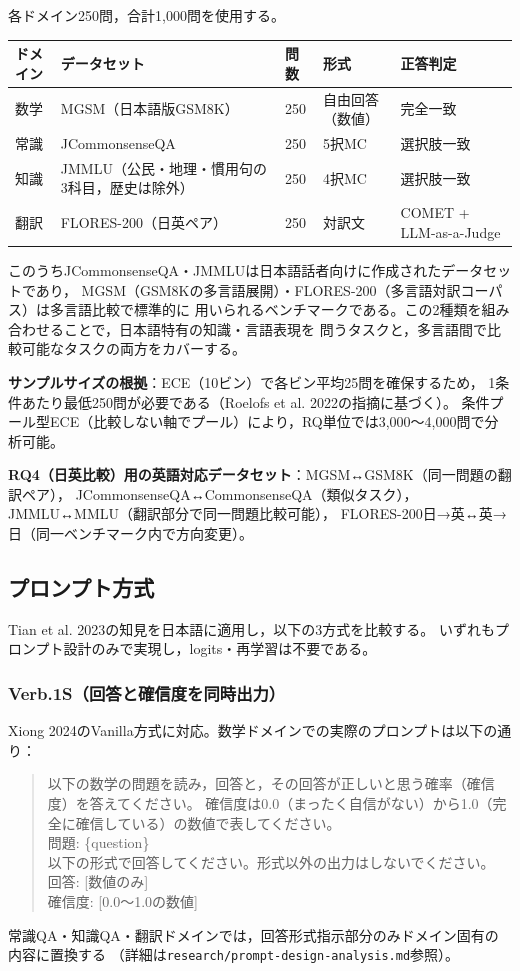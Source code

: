 \documentclass[11pt,a4paper,oneside]{article}
\begin{document}
各ドメイン250問，合計1,000問を使用する。

\begin{center}
\begin{tabular}{lllll}
\toprule
ドメイン & データセット & 問数 & 形式 & 正答判定 \\
\midrule
数学 & MGSM（日本語版GSM8K） & 250 & 自由回答（数値） & 完全一致 \\
常識 & JCommonsenseQA & 250 & 5択MC & 選択肢一致 \\
知識 & JMMLU（公民・地理・慣用句の3科目，歴史は除外） & 250 & 4択MC & 選択肢一致 \\
翻訳 & FLORES-200（日英ペア） & 250 & 対訳文 & COMET + LLM-as-a-Judge \\
\bottomrule
\end{tabular}
\end{center}

このうちJCommonsenseQA・JMMLUは日本語話者向けに作成されたデータセットであり，
MGSM（GSM8Kの多言語展開）・FLORES-200（多言語対訳コーパス）は多言語比較で標準的に
用いられるベンチマークである。この2種類を組み合わせることで，日本語特有の知識・言語表現を
問うタスクと，多言語間で比較可能なタスクの両方をカバーする。

\textbf{サンプルサイズの根拠}：ECE（10ビン）で各ビン平均25問を確保するため，
1条件あたり最低250問が必要である（Roelofs et al. 2022の指摘に基づく）。
条件プール型ECE（比較しない軸でプール）により，RQ単位では3,000〜4,000問で分析可能。

\textbf{RQ4（日英比較）用の英語対応データセット}：MGSM↔GSM8K（同一問題の翻訳ペア），
JCommonsenseQA↔CommonsenseQA（類似タスク），JMMLU↔MMLU（翻訳部分で同一問題比較可能），
FLORES-200日→英↔英→日（同一ベンチマーク内で方向変更）。

\subsection{プロンプト方式}

Tian et al. 2023の知見を日本語に適用し，以下の3方式を比較する。
いずれもプロンプト設計のみで実現し，logits・再学習は不要である。

\subsubsection*{Verb.1S（回答と確信度を同時出力）}
Xiong 2024のVanilla方式に対応。数学ドメインでの実際のプロンプトは以下の通り：
\begin{quote}\ttfamily\small
以下の数学の問題を読み，回答と，その回答が正しいと思う確率（確信度）を答えてください。
確信度は0.0（まったく自信がない）から1.0（完全に確信している）の数値で表してください。\\
問題: \{question\}\\
以下の形式で回答してください。形式以外の出力はしないでください。\\
回答: [数値のみ]\\
確信度: [0.0〜1.0の数値]
\end{quote}
常識QA・知識QA・翻訳ドメインでは，回答形式指示部分のみドメイン固有の内容に置換する
（詳細は\texttt{research/prompt-design-analysis.md}参照）。
\end{document}
